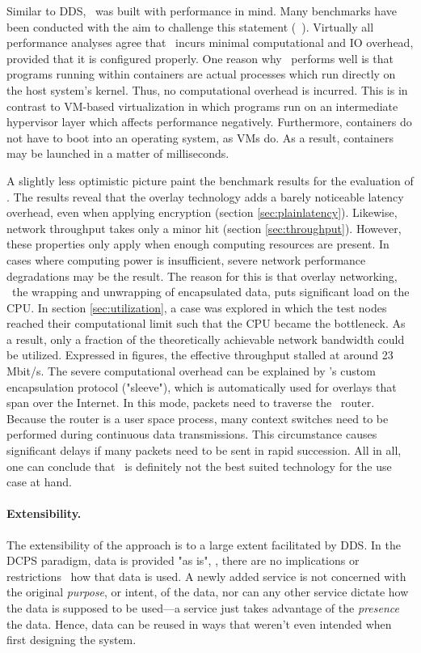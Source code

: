 Similar to DDS, \docker\ was built with performance in mind. Many benchmarks have been conducted with the aim to challenge this statement (\eg\ \cite{felter2015updated,morabito2015hypervisors}). Virtually all performance analyses agree that \docker\ incurs minimal computational and IO overhead, provided that it is configured properly. One reason why \docker\ performs well is that programs running within containers are actual processes which run directly on the host system's kernel. Thus, no computational overhead is incurred. This is in contrast to VM-based virtualization in which programs run on an intermediate hypervisor layer which affects performance negatively. Furthermore, containers do not have to boot into an operating system, as VMs do. As a result, containers may be launched in a matter of milliseconds.

A slightly less optimistic picture paint the benchmark results for the evaluation of \wnet . The results reveal that the overlay technology adds a barely noticeable latency overhead, even when applying encryption (\cf section \ref{sec:plainlatency}). Likewise, network throughput takes only a minor hit (\cf section \ref{sec:throughput}). However, these properties only apply when enough computing resources are present. In cases where computing power is insufficient, severe network performance degradations may be the result. The reason for this is that overlay networking, \ie\ the wrapping and unwrapping of encapsulated data, puts significant load on the CPU. In section \ref{sec:utilization}, a case was explored in which the test nodes reached their computational limit such that the CPU became the bottleneck. As a result, only a fraction of the theoretically achievable network bandwidth could be utilized. Expressed in figures, the effective throughput stalled at around 23 Mbit/s. The severe computational overhead can be explained by \weave 's custom encapsulation protocol ("sleeve"), which is automatically used for overlays that span over the Internet. In this mode, packets need to traverse the \weave\ router. Because the router is a user space process, many context switches need to be performed during continuous data transmissions. This circumstance causes significant delays if many packets need to be sent in rapid succession. All in all, one can conclude that \wnet\ is definitely not the best suited technology for the use case at hand.

\paragraph{Extensibility.}
The extensibility of the approach is to a large extent facilitated by DDS. In the DCPS paradigm, data is provided "as is", \ie , there are no implications or restrictions \wrt\ how that data is used. A newly added service is not concerned with the original \emph{purpose}, or intent, of the data, nor can any other service dictate how the data is supposed to be used---a service just takes advantage of the \emph{presence} the data. Hence, data can be reused in ways that weren't even intended when first designing the system.

